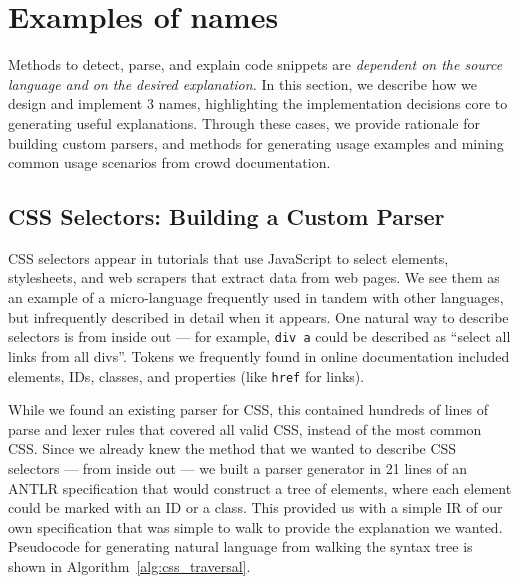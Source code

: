 \section{Examples of \Glspl{name}}

Methods to detect, parse, and explain code snippets are \emph{dependent on the source language and on the desired explanation.}
In this section, we describe how we design and implement 3 \glspl{name}, highlighting the implementation decisions core to generating useful explanations.
Through these cases, we provide rationale for building custom parsers, and methods for generating usage examples and mining common usage scenarios from crowd documentation.

\subsection{CSS Selectors: Building a Custom Parser}

CSS selectors appear in tutorials that use JavaScript to select elements, stylesheets, and web scrapers that extract data from web pages.
We see them as an example of a micro-language frequently used in tandem with other languages, but infrequently described in detail when it appears.
One natural way to describe selectors is from inside out --- for example, \texttt{div a} could be described as ``select all links from all divs''.
Tokens we frequently found in online documentation included elements, IDs, classes, and properties (like \texttt{href} for links).

While we found an existing parser for CSS, this contained hundreds of lines of parse and lexer rules that covered all valid CSS, instead of the most common CSS.
Since we already knew the method that we wanted to describe CSS selectors --- from inside out --- we built a parser generator in 21 lines of an ANTLR specification that would construct a tree of elements, where each element could be marked with an ID or a class.
This provided us with a simple IR of our own specification that was simple to walk to provide the explanation we wanted.
Pseudocode for generating natural language from walking the syntax tree is shown in Algorithm~\ref{alg:css_traversal}.  

